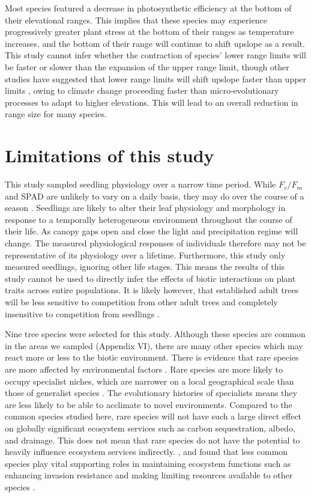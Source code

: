 \documentclass[a4paper, 11pt]{article}
\begin{document}
Most species featured a decrease in photosynthetic efficiency at the bottom of their elevational ranges. This implies that these species may experience progressively greater plant stress at the bottom of their ranges as temperature increases, and the bottom of their range will continue to shift upslope as a result. This study cannot infer whether the contraction of species' lower range limits will be faster or slower than the expansion of the upper range limit, though other studies have suggested that lower range limits will shift upslope faster than upper limits \citep{Campbell2007}, owing to climate change proceeding faster than micro-evolutionary processes to adapt to higher elevations. This will lead to an overall reduction in range size for many species.

\section{Limitations of this study}
This study sampled seedling physiology over a narrow time period. While $F_v/F_m$ and SPAD are unlikely to vary on a daily basis, they may do over the course of a season \citep{Porcar-Castell2008}. Seedlings are likely to alter their leaf physiology and morphology in response to a temporally heterogeneous environment throughout the course of their life. As canopy gaps open and close the light and precipitation regime will change. The measured physiological responses of individuals therefore may not be representative of its physiology over a lifetime. Furthermore, this study only measured seedlings, ignoring other life stages. This means the results of this study cannot be used to directly infer the effects of biotic interactions on plant traits across entire populations. It is likely however, that established adult trees will be less sensitive to competition from other adult trees and completely insensitive to competition from seedlings \citep{Paine2008}. 

Nine tree species were selected for this study. Although these species are common in the areas we sampled (Appendix VI), there are many other species which may react more or less to the biotic environment. There is evidence that rare species are more affected by environmental factors \citep{Lyons2005,Mouillot2013}. Rare species are more likely to occupy specialist niches, which are narrower on a local geographical scale than those of generalist species \citep{Boulangeat2012}. The evolutionary histories of specialists means they are less likely to be able to acclimate to novel environments. Compared to the common species studied here, rare species will not have such a large direct effect on globally significant ecosystem services such as carbon sequestration, albedo, and drainage. This does not mean that rare species do not have the potential to heavily influence ecosystem services indirectly. \citet{Lyons2001}, and \citet{Lyons2005} found that less common species play vital supporting roles in maintaining ecosystem functions such as enhancing invasion resistance and making limiting resources available to other species  . 
\end{document}

